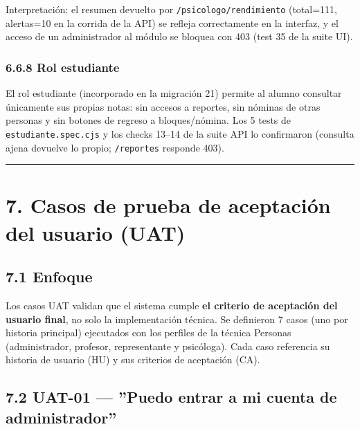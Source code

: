 \documentclass[11pt,a4paper]{article}
\begin{document}
Interpretación: el resumen devuelto por \texttt{/psicologo/rendimiento} (total=111, alertas=10 en la corrida de la API) se refleja correctamente en la interfaz, y el acceso de un administrador al módulo se bloquea con 403 (test 35 de la suite UI).


\subsubsection*{6.6.8 Rol estudiante}


El rol estudiante (incorporado en la migración 21) permite al alumno consultar únicamente sus propias notas: sin accesos a reportes, sin nóminas de otras personas y sin botones de regreso a bloques/nómina. Los 5 tests de \texttt{estudiante.spec.cjs} y los checks 13--14 de la suite API lo confirmaron (consulta ajena devuelve lo propio; \texttt{/reportes} responde 403).


\hrule\vspace{0.4em}


\section*{7. Casos de prueba de aceptación del usuario (UAT)}


\subsection*{7.1 Enfoque}


Los casos UAT validan que el sistema cumple \textbf{el criterio de aceptación del usuario final}, no solo la implementación técnica. Se definieron 7 casos (uno por historia principal) ejecutados con los perfiles de la técnica Personas (administrador, profesor, representante y psicóloga). Cada caso referencia su historia de usuario (HU) y sus criterios de aceptación (CA).


\subsection*{7.2 UAT-01 --- ''Puedo entrar a mi cuenta de administrador''}
\end{document}
